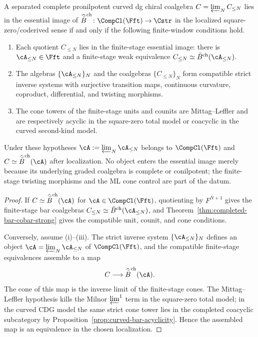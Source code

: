 \begin{proposition}
\label{prop:completion-closure-essential-image}
A separated complete pronilpotent curved dg chiral coalgebra
$C=\varprojlim_N C_{\le N}$ lies in the essential image of
$\widehat{\bar B}^{\mathrm{ch}}\colon\CompCl(\Fft)\to\Cstr$ in the
localized square-zero/coderived sense if and only if the following
finite-window conditions hold.
\begin{enumerate}[label=\textup{(\roman*)}]
\item Each quotient $C_{\le N}$ lies in the finite-stage essential
 image: there is $\cA_{\le N}\in\Fft$ and a finite-stage weak
 equivalence
 $C_{\le N}\simeq \bar B^{\mathrm{ch}}(\cA_{\le N})$.
\item The algebras $\{\cA_{\le N}\}_N$ and the coalgebras
 $\{C_{\le N}\}_N$ form compatible strict inverse systems with
 surjective transition maps, continuous curvature, coproduct,
 differential, and twisting morphisms.
\item The cone towers of the finite-stage units and counits are
 Mittag--Leffler and are respectively acyclic in the square-zero total
 model or coacyclic in the curved second-kind model.
\end{enumerate}
Under these hypotheses
$\cA:=\varprojlim_N\cA_{\le N}$ belongs to $\CompCl(\Fft)$ and
$C\simeq\widehat{\bar B}^{\mathrm{ch}}(\cA)$ after localization.
No object enters the essential image merely because its underlying
graded coalgebra is complete or conilpotent; the finite-stage
twisting morphisms and the ML cone control are part of the datum.
\end{proposition}

\begin{proof}
If $C\simeq\widehat{\bar B}^{\mathrm{ch}}(\cA)$ for
$\cA\in\CompCl(\Fft)$, quotienting by $F^{N+1}$ gives the finite-stage
bar coalgebras
$C_{\le N}\simeq\bar B^{\mathrm{ch}}(\cA_{\le N})$, and
Theorem~\ref{thm:completed-bar-cobar-strong} gives the compatible
unit, counit, and cone conditions.

Conversely, assume \textup{(i)--(iii)}. The strict inverse system
$\{\cA_{\le N}\}_N$ defines an object
$\cA=\varprojlim_N\cA_{\le N}$ of $\CompCl(\Fft)$, and the compatible
finite-stage equivalences assemble to a map
\[
C\longrightarrow \widehat{\bar B}^{\mathrm{ch}}(\cA).
\]
The cone of this map is the inverse limit of the finite-stage cones.
The Mittag--Leffler hypothesis kills the Milnor
$\varprojlim^1$ term in the square-zero total model; in the curved
CDG model the same strict cone tower lies in the completed coacyclic
subcategory by Proposition~\ref{prop:curved-bar-acyclicity}. Hence the
assembled map is an equivalence in the chosen localization.
\end{proof}


